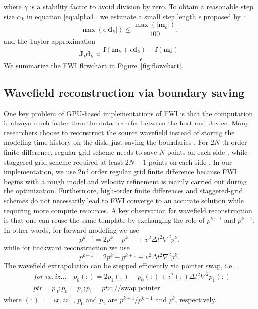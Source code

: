 where $\gamma$ is a stability factor to avoid division by zero.
To obtain a reasonable step size $\alpha_k$ in equation \eqref{eq:alpha1}, we estimate a small step length $\epsilon$ proposed by \cite{pica1990nonlinear}:
\begin{equation}
\max(\epsilon |\textbf{d}_k|)\leqslant \frac{\max(|\textbf{m}_k|)}{100}.
\end{equation}
and the Taylor approximation
\begin{equation}
\textbf{J}_k\textbf{d}_k\approx\frac{\textbf{f}(\textbf{m}_k+\epsilon \textbf{d}_k)-\textbf{f}(\textbf{m}_k)}{\epsilon}
\end{equation}
We summarize the FWI flowchart in Figure~\ref{fig:flowchart}.




\subsection{Wavefield reconstruction via boundary saving}

One key problem of GPU-based implementations of FWI is that the computation is always much faster than the data transfer between the host and device. Many researchers choose to reconstruct the source wavefield instead of storing the modeling time history on the disk, just saving the boundaries \citep{dussaud2008computational,Yang201464}. For $2N$-th order finite difference, regular grid scheme needs to save $N$ points on each side \citep{dussaud2008computational}, while staggered-grid scheme required at least $2N-1$ points on each side \citep{Yang201464}. In our implementation, we use 2nd order regular grid finite difference because FWI begins with a rough model and velocity refinement is mainly carried out during the optimization. Furthermore, high-order finite differences and staggered-grid schemes do not necessarily lead to FWI converge to an accurate solution while requiring more compute resources. A key observation for wavefield reconstruction is that one can reuse the same template by exchanging the role of $p^{k+1}$ and $p^{k-1}$. In other words, for forward modeling we use
\begin{equation}\label{eq:forward}
p^{k+1}=2p^{k}-p^{k-1}+v^2\Delta t^2 \nabla^2 p^{k}.
\end{equation}
while for backward reconstruction we use
\begin{equation}\label{eq:backward}
p^{k-1}=2p^{k}-p^{k+1}+v^2\Delta t^2 \nabla^2 p^{k}.
\end{equation}
The wavefield extrapolation can be stepped efficiently via pointer swap, i.e.,
\begin{equation}
\begin{split}
 &for\;ix,iz... \quad p_0(:)=2p_1(:)-p_0(:)+v^2(:)\Delta t^2 \nabla^2 p_1(:)\\
 &ptr=p_0;p_0=p_1;p_1=ptr;// \mathrm{swap\; pointer}
\end{split}
\end{equation}
where $(:)=[ix,iz]$, $p_0$ and $p_1$ are $p^{k+1}/p^{k-1}$ and $p^k$, respectively. 


